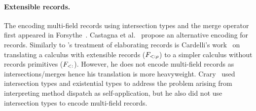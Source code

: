 \paragraph{Extensible records.}%
The encoding multi-field records using intersection types and the merge operator first appeared in 
Forsythe~\cite{reynolds1997design}. Castagna et
al.~\cite{castagna1995calculus} propose an alternative encoding for records. 
Similarly to \name's treatment of elaborating records is
Cardelli's work~\cite{cardelli1992extensible} on translating a calculus
with extensible records ($ F_{<: \rho}$) to a simpler calculus without
records primitives ($ F_{<:} $). 
However, he does not encode multi-field records as intersections/merges hence his translation is more
heavyweight. 
Crary~\cite{crary1998simple} used intersection types and
existential types to address the problem arising from interpreting method
dispatch as self-application, 
but he also did not use intersection types to encode multi-field records.

